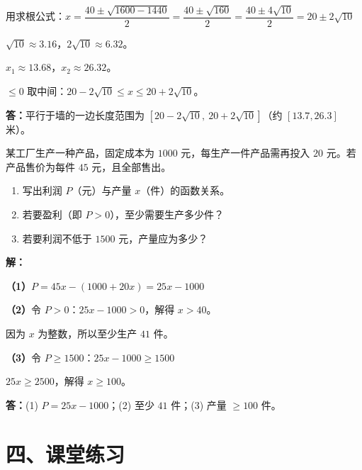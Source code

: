 \documentclass[12pt, a4paper]{ctexart}
\begin{document}
用求根公式：$x = \dfrac{40 \pm \sqrt{1600 - 1440}}{2} = \dfrac{40 \pm \sqrt{160}}{2} = \dfrac{40 \pm 4\sqrt{10}}{2} = 20 \pm 2\sqrt{10}$

$\sqrt{10} \approx 3.16$，$2\sqrt{10} \approx 6.32$。

$x_1 \approx 13.68$，$x_2 \approx 26.32$。

$\leq 0$ 取中间：$20 - 2\sqrt{10} \leq x \leq 20 + 2\sqrt{10}$。

\textbf{答：}平行于墙的一边长度范围为 $[20 - 2\sqrt{10},\ 20 + 2\sqrt{10}]$（约 $[13.7, 26.3]$ 米）。

\begin{appbox}[【应用3】利润不低于目标]
某工厂生产一种产品，固定成本为 $1000$ 元，每生产一件产品需再投入 $20$ 元。若产品售价为每件 $45$ 元，且全部售出。
\begin{enumerate}[label=(\arabic*)]
  \item 写出利润 $P$（元）与产量 $x$（件）的函数关系。
  \item 若要盈利（即 $P > 0$），至少需要生产多少件？
  \item 若要利润不低于 $1500$ 元，产量应为多少？
\end{enumerate}
\end{appbox}

\textbf{解：}

\textbf{（1）}$P = 45x - (1000 + 20x) = 25x - 1000$

\textbf{（2）}令 $P > 0$：$25x - 1000 > 0$，解得 $x > 40$。

因为 $x$ 为整数，所以至少生产 $41$ 件。

\textbf{（3）}令 $P \geq 1500$：$25x - 1000 \geq 1500$

$25x \geq 2500$，解得 $x \geq 100$。

\textbf{答：}(1) $P = 25x - 1000$；(2) 至少 $41$ 件；(3) 产量 $\geq 100$ 件。


\section*{\textcolor{tipgreen}{四、课堂练习}}
\end{document}
